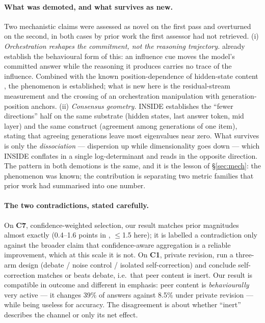 \documentclass[10pt,a4paper]{article}
\newcommand{\ax}[1]{\textcolor{accent}{\textbf{#1}}}
\begin{document}

\vspace{-4pt}
\label{tab:novelty}

\paragraph{What was demoted, and what survives as new.} Two mechanistic claims were assessed as novel on the first pass and overturned on the second, in both cases by prior work the first assessor had not retrieved.
(i) \emph{Orchestration reshapes the commitment, not the reasoning trajectory.} \citet{turpin2023unfaithful} already establish the behavioural form of this: an influence cue moves the model's committed answer while the reasoning it produces carries no trace of the influence. Combined with the known position-dependence of hidden-state content \citep{wang2026truth}, the phenomenon is established; what is new here is the residual-stream measurement and the crossing of an orchestration manipulation with generation-position anchors.
(ii) \emph{Consensus geometry.} INSIDE \citep{chen2024inside} establishes the ``fewer directions'' half on the same substrate (hidden states, last answer token, mid layer) and the same construct (agreement among generations of one item), stating that agreeing generations leave most eigenvalues near zero. What survives is only the \emph{dissociation} --- dispersion up while dimensionality goes down --- which INSIDE conflates in a single log-determinant and \citet{ontalvilla2026agreement} reads in the opposite direction.
The pattern in both demotions is the same, and it is the lesson of \S\ref{sec:mech}: the phenomenon was known; the contribution is separating two metric families that prior work had summarised into one number.

\paragraph{The two contradictions, stated carefully.} On \ax{C7}, confidence-weighted selection, our result matches prior magnitudes almost exactly (0.4--1.6 points in \citet{taubenfeld2025confidence}, $\le$1.5 here); it is labelled a contradiction only against the broader claim that confidence-aware aggregation is a reliable improvement, which at this scale it is not. On \ax{C1}, private revision, \citet{bertalanic2026consensus} run a three-arm design (debate / noise control / isolated self-correction) and conclude self-correction matches or beats debate, i.e.\ that peer content is inert. Our result is compatible in outcome and different in emphasis: peer content is \emph{behaviourally} very active --- it changes 39\% of answers against 8.5\% under private revision --- while being useless for accuracy. The disagreement is about whether ``inert'' describes the channel or only its net effect.
\end{document}
